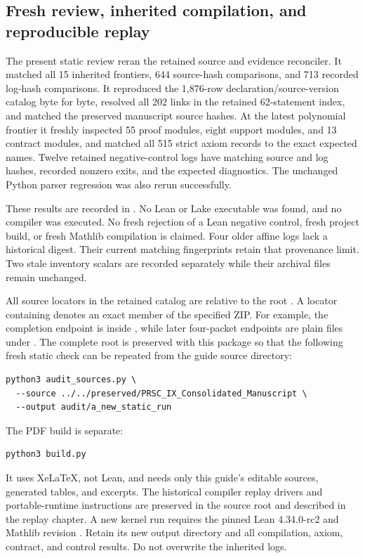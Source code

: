 \subsection{Fresh review, inherited compilation, and reproducible replay}
The present static review reran the retained source and evidence reconciler. It matched all 15 inherited frontiers, 644 source-hash comparisons, and 713 recorded log-hash comparisons. It reproduced the 1,876-row declaration/source-version catalog byte for byte, resolved all 202 links in the retained 62-statement index, and matched the preserved manuscript source hashes. At the latest polynomial frontier it freshly inspected 55 proof modules, eight support modules, and 13 contract modules, and matched all 515 strict axiom records to the exact expected names. Twelve retained negative-control logs have matching source and log hashes, recorded nonzero exits, and the expected diagnostics. The unchanged Python parser regression was also rerun successfully.

These results are recorded in . No Lean or Lake executable was found, and no compiler was executed. No fresh rejection of a Lean negative control, fresh project build, or fresh Mathlib compilation is claimed. Four older affine logs lack a historical digest. Their current matching fingerprints retain that provenance limit. Two stale inventory scalars are recorded separately while their archival files remain unchanged.

All source locators in the retained catalog are relative to the root . A locator containing \code{!} denotes an exact member of the specified ZIP. For example, the completion endpoint is inside , while later four-packet endpoints are plain files under . The complete root is preserved with this package so that the following fresh static check can be repeated from the guide source directory:
\begin{Verbatim}[fontsize=\small,breaklines=true,breakanywhere=true]
python3 audit_sources.py \
  --source ../../preserved/PRSC_IX_Consolidated_Manuscript \
  --output audit/a_new_static_run
\end{Verbatim}

The PDF build is separate:
\begin{Verbatim}[fontsize=\small,breaklines=true,breakanywhere=true]
python3 build.py
\end{Verbatim}
It uses XeLaTeX, not Lean, and needs only this guide's editable sources, generated tables, and excerpts. The historical compiler replay drivers and portable-runtime instructions are preserved in the source root and described in the replay chapter. A new kernel run requires the pinned Lean 4.34.0-rc2 and Mathlib revision . Retain its new output directory and all compilation, axiom, contract, and control results. Do not overwrite the inherited logs.

